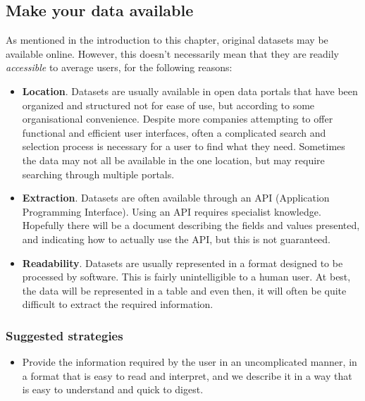 \subsection{Make your data available}
    
As mentioned in the introduction to this chapter, original datasets may be available online. However, this doesn't necessarily
mean that they are readily \emph{accessible} to average users, for the following reasons:

\begin{itemize}
    \item \textbf{Location}. Datasets are usually available in open data portals that have been organized and structured not for ease of use, but according to some
          organisational convenience. 
          Despite more companies attempting to offer functional and efficient user interfaces, often a complicated search and selection process is necessary for a user to find what they need.
          Sometimes the data may not all be available in the one location, but may require searching through multiple portals.

    \item \textbf{Extraction}. Datasets are often available through an API (Application Programming Interface). Using an API requires specialist knowledge.
          Hopefully there will be a document describing the fields and values presented, and indicating how to actually use the API, but this is not guaranteed.

    \item \textbf{Readability}. Datasets are usually represented in a format designed to be processed by software. This is fairly unintelligible to a human user. At best,
          the data will be represented in a table and even then, it will often be quite difficult to extract the required information.
\end{itemize}

\subsubsection*{Suggested strategies} 

\begin{itemize}
    \item Provide the information required by the user in an uncomplicated manner, in a format that is easy to read and interpret,
          and we describe it in a way that is easy to understand and quick to digest.\\
\end{itemize}
 
